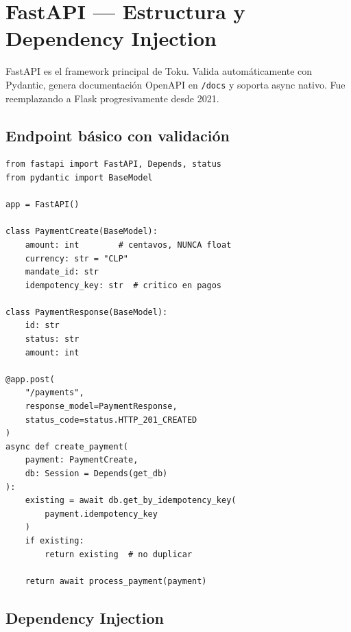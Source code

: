 \documentclass[11pt,a4paper]{article}
\begin{document}
\tableofcontents
\newpage

\section{FastAPI — Estructura y Dependency Injection}

\begin{keybox}
FastAPI es el framework principal de Toku. Valida automáticamente con Pydantic,
genera documentación OpenAPI en \texttt{/docs} y soporta async nativo. Fue
reemplazando a Flask progresivamente desde 2021.
\end{keybox}

\subsection{Endpoint básico con validación}

\begin{pybox}
\begin{lstlisting}[style=python]
from fastapi import FastAPI, Depends, status
from pydantic import BaseModel

app = FastAPI()

class PaymentCreate(BaseModel):
    amount: int        # centavos, NUNCA float
    currency: str = "CLP"
    mandate_id: str
    idempotency_key: str  # critico en pagos

class PaymentResponse(BaseModel):
    id: str
    status: str
    amount: int

@app.post(
    "/payments",
    response_model=PaymentResponse,
    status_code=status.HTTP_201_CREATED
)
async def create_payment(
    payment: PaymentCreate,
    db: Session = Depends(get_db)
):
    existing = await db.get_by_idempotency_key(
        payment.idempotency_key
    )
    if existing:
        return existing  # no duplicar

    return await process_payment(payment)
\end{lstlisting}
\end{pybox}

\subsection{Dependency Injection}
\end{document}
